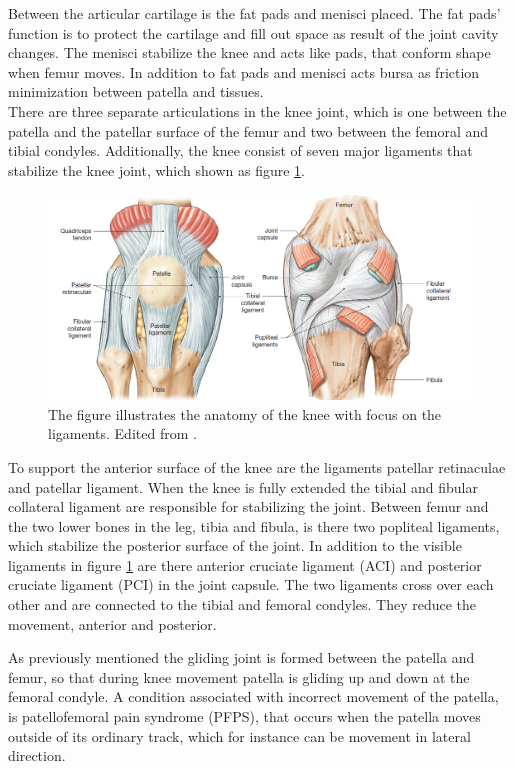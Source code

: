 Between the articular cartilage is the fat pads and menisci placed. The fat pads’ function is to protect the cartilage and fill out space as result of the joint cavity changes. The menisci stabilize the knee and acts like pads, that conform shape when femur moves. In addition to fat pads and menisci acts bursa as friction minimization between patella and tissues.\citep{Martini2012} \\
There are three separate articulations in the knee joint, which is one between the patella and the patellar surface of the femur and two between the femoral and tibial condyles. Additionally, the knee consist of seven major ligaments that stabilize the knee joint, which shown as figure \ref{fig:knee}.\citep{Martini2012}

\begin{figure} [H]
\centering
\includegraphics[width=1\textwidth]{figures/knee}
\caption{The figure illustrates the anatomy of the knee with focus on the ligaments. Edited from \citep{Martini2012}.}
\label{fig:knee}
\end{figure}

\noindent
To support the anterior surface of the knee are the ligaments patellar retinaculae and patellar ligament. When the knee is fully extended the tibial and fibular collateral ligament are responsible for stabilizing the joint. Between femur and the two lower bones in the leg, tibia and fibula, is there two popliteal ligaments, which stabilize the posterior surface of the joint. In addition to the visible ligaments in figure \ref{fig:knee} are there anterior cruciate ligament (ACI) and posterior cruciate ligament (PCI) in the joint capsule. The two ligaments cross over each other and are connected to the tibial and femoral condyles. They reduce the movement, anterior and posterior.\citep{Martini2012}

As previously mentioned the gliding joint is formed between the patella and femur, so that during knee movement patella is gliding up and down at the femoral condyle. A condition associated with incorrect movement of the patella, is patellofemoral pain syndrome (PFPS), that occurs when the patella moves outside of its ordinary track, which for instance can be movement in lateral direction.\citep{Martini2012}



